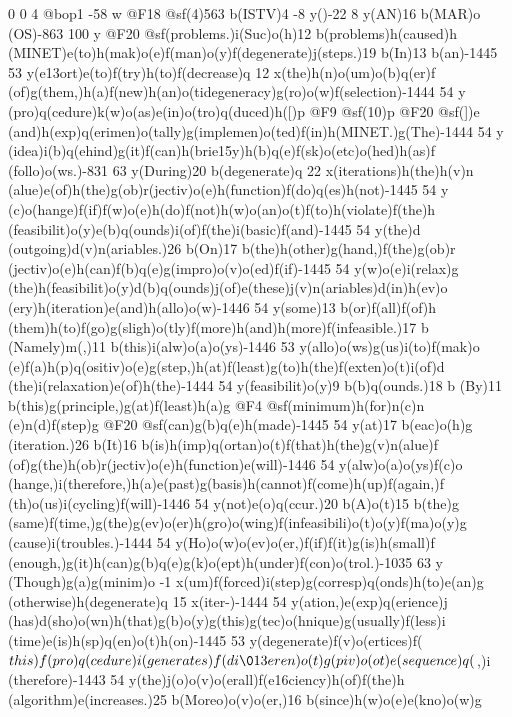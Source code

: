 {{{{{{{{{{0 0 4 @bop1 -58 w @F18 @sf(4)563 b(ISTV)4 -8 y()-22 8 y(AN)16 b(MAR)o
(OS)-863 100 y @F20 @sf(problems.)i(Suc)o(h)12 b(problems)h(caused)h
(MINET)e(to)h(mak)o(e)f(man)o(y)f(degenerate)j(steps.)19 b(In)13 b(an)-1445 
53 y(e\013ort)e(to)f(try)h(to)f(decrease)q 12 x(the)h(n)o(um)o(b)q(er)f
(of)g(them,)h(a)f(new)h(an)o(ti{degeneracy)g(ro)o(w)f(selection)-1444 54 y
(pro)q(cedure)k(w)o(as)e(in)o(tro)q(duced)h([)p @F9 @sf(10)p @F20 @sf(])e
(and)h(exp)q(erimen)o(tally)g(implemen)o(ted)f(in)h(MINET.)g(The)-1444 54 y
(idea)i(b)q(ehind)g(it)f(can)h(brie\015y)h(b)q(e)f(sk)o(etc)o(hed)h(as)f
(follo)o(ws.)-831 63 y(During)20 b(degenerate)q 22 x(iterations)h(the)h(v)n
(alue)e(of)h(the)g(ob)r(jectiv)o(e)h(function)f(do)q(es)h(not)-1445 54 y
(c)o(hange)f(if)f(w)o(e)h(do)f(not)h(w)o(an)o(t)f(to)h(violate)f(the)h
(feasibilit)o(y)e(b)q(ounds)i(of)f(the)i(basic)f(and)-1445 54 y(the)d
(out{going)d(v)n(ariables.)26 b(On)17 b(the)h(other)g(hand,)f(the)g(ob)r
(jectiv)o(e)h(can)f(b)q(e)g(impro)o(v)o(ed)f(if)-1445 54 y(w)o(e)i(relax)g
(the)h(feasibilit)o(y)d(b)q(ounds)j(of)e(these)j(v)n(ariables)d(in)h(ev)o
(ery)h(iteration)e(and)h(allo)o(w)-1446 54 y(some)13 b(or)f(all)f(of)h
(them)h(to)f(go)g(sligh)o(tly)f(more)h(and)h(more)f(infeasible.)17 b
(Namely)m(,)11 b(this)i(alw)o(a)o(ys)-1446 53 y(allo)o(ws)g(us)i(to)f(mak)o
(e)f(a)h(p)q(ositiv)o(e)g(step,)h(at)f(least)g(to)h(the)f(exten)o(t)i(of)d
(the)i(relaxation)e(of)h(the)-1444 54 y(feasibilit)o(y)9 b(b)q(ounds.)18 b
(By)11 b(this)g(principle,)g(at)f(least)h(a)g @F4 @sf(minimum)h(for)n(c)n
(e)n(d)f(step)g @F20 @sf(can)g(b)q(e)h(made)-1445 54 y(at)17 b(eac)o(h)g
(iteration.)26 b(It)16 b(is)h(imp)q(ortan)o(t)f(that)h(the)g(v)n(alue)f
(of)g(the)h(ob)r(jectiv)o(e)h(function)e(will)-1446 54 y(alw)o(a)o(ys)f(c)o
(hange,)i(therefore,)h(a)e(past)g(basis)h(cannot)f(come)h(up)f(again,)f
(th)o(us)i(cycling)f(will)-1446 54 y(not)e(o)q(ccur.)20 b(A)o(t)15 b(the)g
(same)f(time,)g(the)g(ev)o(er)h(gro)o(wing)f(infeasibili)o(t)o(y)f(ma)o(y)g
(cause)i(troubles.)-1444 54 y(Ho)o(w)o(ev)o(er,)f(if)f(it)g(is)h(small)f
(enough,)g(it)h(can)g(b)q(e)g(k)o(ept)h(under)f(con)o(trol.)-1035 63 y
(Though)g(a)g(minim)o -1 x(um)f(forced)i(step)g(corresp)q(onds)h(to)e(an)g
(otherwise)h(degenerate)q 15 x(iter-)-1444 54 y(ation,)e(exp)q(erience)j
(has)d(sho)o(wn)h(that)g(b)o(y)g(this)g(tec)o(hnique)g(usually)f(less)i
(time)e(is)h(sp)q(en)o(t)h(on)-1445 53 y(degenerate)f(v)o(ertices)f(\(this)f
(pro)q(cedure)i(generates)f(di\013eren)o(t)g(piv)o(ot)e(sequence)q(\),)i
(therefore)-1443 54 y(the)j(o)o(v)o(erall)f(e\016ciency)h(of)f(the)h
(algorithm)e(increases.)25 b(Moreo)o(v)o(er,)16 b(since)h(w)o(e)e(kno)o(w)g
}}}}}}}}}}}}
